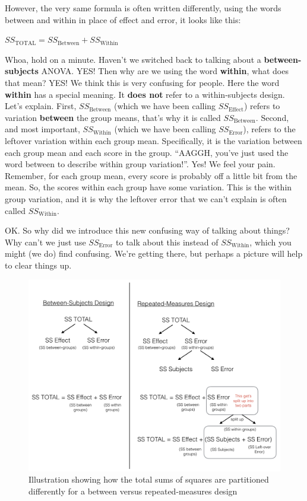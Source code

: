 \documentclass[
]{book}
\begin{document}
However, the very same formula is often written differently, using the words between and within in place of effect and error, it looks like this:

\(SS_\text{TOTAL} = SS_\text{Between} + SS_\text{Within}\)

Whoa, hold on a minute. Haven't we switched back to talking about a \textbf{between-subjects} ANOVA. YES! Then why are we using the word \textbf{within}, what does that mean? YES! We think this is very confusing for people. Here the word \textbf{within} has a special meaning. It \textbf{does not} refer to a within-subjects design. Let's explain. First, \(SS_\text{Between}\) (which we have been calling \(SS_\text{Effect}\)) refers to variation \textbf{between} the group means, that's why it is called \(SS_\text{Between}\). Second, and most important, \(SS_\text{Within}\) (which we have been calling \(SS_\text{Error}\)), refers to the leftover variation within each group mean. Specifically, it is the variation between each group mean and each score in the group. ``AAGGH, you've just used the word between to describe within group variation!''. Yes! We feel your pain. Remember, for each group mean, every score is probably off a little bit from the mean. So, the scores within each group have some variation. This is the within group variation, and it is why the leftover error that we can't explain is often called \(SS_\text{Within}\).

OK. So why did we introduce this new confusing way of talking about things? Why can't we just use \(SS_\text{Error}\) to talk about this instead of \(SS_\text{Within}\), which you might (we do) find confusing. We're getting there, but perhaps a picture will help to clear things up.

\begin{figure}
\centering
\includegraphics{figures/SS_ANOVA.png}
\caption{\label{fig:8splitSS}Illustration showing how the total sums of squares are partitioned differently for a between versus repeated-measures design}
\end{figure}
\end{document}
